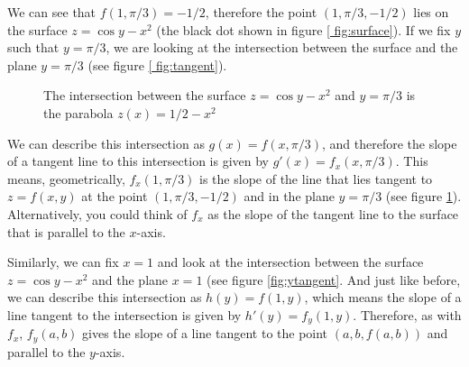 We can see that $f(1, \pi/3) = -1/2$, therefore the point $(1, \pi/3, -1/2)$ 
lies on the surface $z = \cos{y} - x^2$ (the black dot shown in figure \ref{
fig:surface}). If we fix $y$ such that $y = \pi/3$, we are looking at the 
intersection between the surface and the plane $y = \pi/3$ (see figure \ref{
fig:tangent}). 

\begin{figure}[htbp]
    \centering
    \caption{The intersection between the surface $z = \cos{y} - x^2$ and $y = 
    \pi/3$ is the parabola $z(x) = 1/2 - x^2$}
    \label{fig:tangent}
\end{figure}

We can describe this intersection as $g(x) = f(x, \pi/3)$, and therefore the 
slope of a tangent line to this intersection is given by $g'(x) = f_x(x, 
\pi/3)$. This means, geometrically, $f_x(1, \pi/3)$ is the slope of the line 
that lies tangent to $z = f(x, y)$ at the point $(1, \pi/3, -1/2)$ and in the 
plane $y = \pi/3$ (see figure \ref{fig:tangent}). Alternatively, you could 
think of $f_x$ as the slope of the tangent line to the surface that is 
parallel to the $x$-axis. 

Similarly, we can fix $x = 1$ and look at the intersection between the surface 
$z = \cos{y} - x^2$ and the plane $x = 1$ (see figure \ref{fig:ytangent}. And 
just like before, we can describe this intersection as $h(y) = f(1, y)$, which 
means the slope of a line tangent to the intersection is given by $h'(y) = 
f_{y}(1, y)$. Therefore, as with $f_x$, $f_y(a, b)$ gives the slope of a line 
tangent to the point $\left(a, b, f(a, b) \right)$ and parallel to the $y$-axis. 

